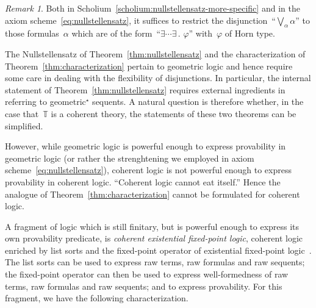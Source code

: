 \documentclass[oneside,reqno]{amsart}
\theoremstyle{definition}
\theoremstyle{plain}
\theoremstyle{remark}
\newtheorem{rem}[defn]{Remark}
\newcommand{\TT}{\mathbb{T}}
\renewcommand{\_}{\mathpunct{.}\,}
\newcommand{\?}{\,{:}\,}
\begin{document}
\begin{rem}Both in Scholium~\ref{scholium:nullstellensatz-more-specific} and in
the axiom scheme~\eqref{eq:nullstellensatz}, it suffices to restrict the
disjunction~``$\bigvee_\alpha \alpha$'' to those formulas~$\alpha$ which are of
the form~``$\exists\cdots\exists\_ \varphi$'' with~$\varphi$ of Horn type.
\end{rem}

The Nullstellensatz of Theorem~\ref{thm:nullstellensatz} and the
characterization of Theorem~\ref{thm:characterization} pertain to geometric
logic and hence require some care in dealing with the flexibility of
disjunctions. In particular, the internal statement of
Theorem~\ref{thm:nullstellensatz} requires external ingredients in referring to
geometric$^\star$ sequents. A natural question is
therefore whether, in the case that~$\TT$ is a coherent theory, the statements
of these two theorems can be simplified.

However, while geometric logic is powerful enough to express
provability in geometric logic (or rather the strenghtening we employed in
axiom scheme~\eqref{eq:nullstellensatz}),
coherent logic is not powerful enough
to express provability in coherent logic. ``Coherent logic cannot eat itself.''
Hence the analogue of Theorem~\ref{thm:characterization} cannot be
formulated for coherent logic.

A fragment of logic which is still finitary, but is powerful enough to express
its own provability predicate, is \emph{coherent existential fixed-point
logic}, coherent logic enriched by list sorts and the fixed-point operator of
existential fixed-point logic~\cite{blass:topoi-and-computation,blass:existential-fixed-point-logic}.
The list sorts can be used to express raw terms, raw formulas and raw
sequents; the fixed-point operator can then be used to express well-formedness of
raw terms, raw formulas and raw sequents; and to express provability. For this
fragment, we have the following characterization.
\end{document}
